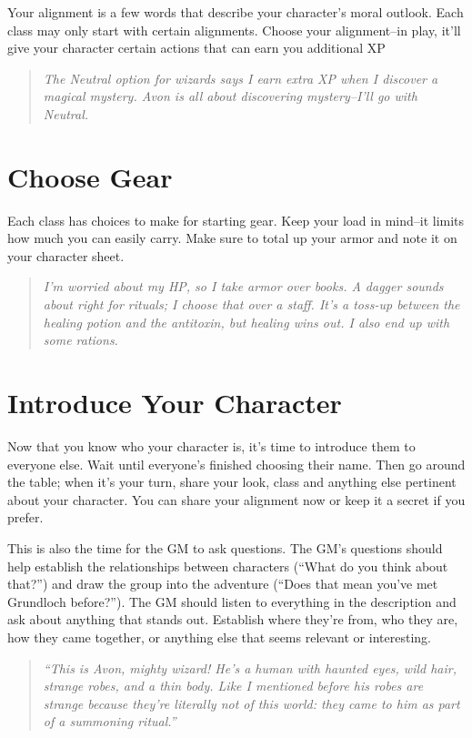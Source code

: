  Your alignment is a few words that describe your character's moral outlook. Each class may only start with certain alignments. Choose your alignment--in play, it'll give your character certain actions that can earn you additional XP


\begin{quote}
\emph{ The Neutral option for wizards says I earn extra XP when I discover a magical mystery. Avon is all about discovering mystery--I'll go with Neutral.}
\end{quote}
\section{Choose Gear}


 Each class has choices to make for starting gear. Keep your load in mind--it limits how much you can easily carry. Make sure to total up your armor and note it on your character sheet.


\begin{quote}
\emph{ I'm worried about my HP, so I take armor over books. A dagger sounds about right for rituals; I choose that over a staff. It's a toss-up between the healing potion and the antitoxin, but healing wins out. I also end up with some rations.}
\end{quote}
\section{Introduce Your Character}


 Now that you know who your character is, it's time to introduce them to everyone else. Wait until everyone's finished choosing their name. Then go around the table; when it's your turn, share your look, class and anything else pertinent about your character. You can share your alignment now or keep it a secret if you prefer.


 This is also the time for the GM to ask questions. The GM's questions should help establish the relationships between characters (``What do you think about that?'') and draw the group into the adventure (``Does that mean you've met Grundloch before?''). The GM should listen to everything in the description and ask about anything that stands out. Establish where they're from, who they are, how they came together, or anything else that seems relevant or interesting.


\begin{quote}
\emph{ ``This is Avon, mighty wizard! He's a human with haunted eyes, wild hair, strange robes, and a thin body. Like I mentioned before his robes are strange because they're literally not of this world: they came to him as part of a summoning ritual.''}
\end{quote}
